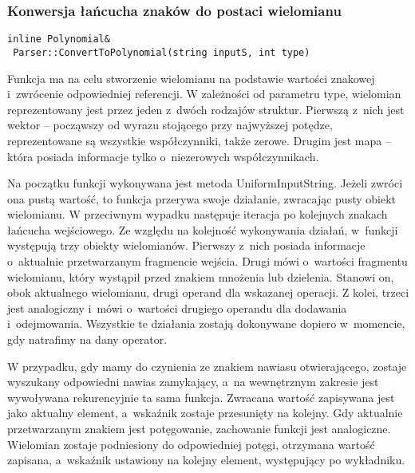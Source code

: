 \subsubsection{Konwersja łańcucha znaków do postaci wielomianu}
\begin{lstlisting}
inline Polynomial&
 Parser::ConvertToPolynomial(string inputS, int type)
\end{lstlisting}

Funkcja ma na celu stworzenie wielomianu na podstawie wartości znakowej i~zwrócenie odpowiedniej referencji. W zależności od parametru type, wielomian reprezentowany jest przez jeden z~dwóch rodzajów struktur. Pierwszą z~nich jest wektor -- począwszy od wyrazu stojącego przy najwyższej potędze, reprezentowane są wszystkie współczynniki, także zerowe. Drugim jest mapa -- która posiada informacje tylko o~niezerowych współczynnikach.

Na początku funkcji wykonywana jest metoda UniformInputString. Jeżeli zwróci ona pustą wartość, to funkcja przerywa swoje działanie, zwracając pusty obiekt wielomianu. W przeciwnym wypadku następuje iteracja po kolejnych znakach łańcucha wejściowego. Ze względu na kolejność wykonywania działań, w~funkcji występują trzy obiekty wielomianów. Pierwszy z~nich posiada informacje o~aktualnie przetwarzanym fragmencie wejścia. Drugi mówi o~wartości fragmentu wielomianu, który wystąpił przed znakiem mnożenia lub dzielenia. Stanowi on, obok aktualnego wielomianu, drugi operand dla wskazanej operacji. Z kolei, trzeci jest analogiczny i~mówi o~wartości drugiego operandu dla dodawania i~odejmowania. Wszystkie te działania zostają dokonywane dopiero w~momencie, gdy natrafimy na dany operator.

W przypadku, gdy mamy do czynienia ze znakiem nawiasu otwierającego, zostaje wyszukany odpowiedni nawias zamykający, a~na wewnętrznym zakresie jest wywoływana rekurencyjnie ta sama funkcja. Zwracana wartość zapisywana jest jako aktualny element, a~wskaźnik zostaje przesunięty na kolejny. Gdy aktualnie przetwarzanym znakiem jest potęgowanie, zachowanie funkcji jest analogiczne. Wielomian zostaje podniesiony do odpowiedniej potęgi, otrzymana wartość zapisana, a~wskaźnik ustawiony na kolejny element, występujący po wykładniku.

